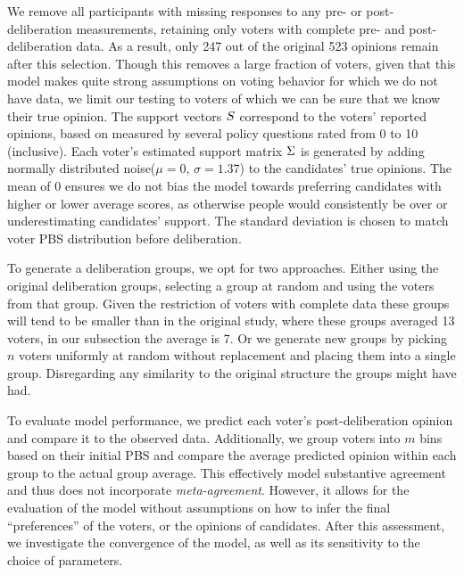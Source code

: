 We remove all participants with missing responses to any pre- or
post-deliberation measurements, retaining only voters with complete pre- and
post-deliberation data. As a result, only 247 out of the original 523 opinions
remain after this selection. Though this removes a large fraction of voters,
given that this model makes quite strong assumptions on voting behavior for
which we do not have data, we limit our testing to voters of which we can be
sure that we know their true opinion. The support vectors $S$ correspond
to the voters' reported opinions, based on measured by several policy questions
rated from 0 to 10 (inclusive). Each voter's estimated support matrix
$\Sigma$ is generated by adding normally distributed noise($\mu=0$, $\sigma=1.37$) to the
candidates' true opinions. The mean of 0 ensures we do not bias the model towards
preferring candidates with higher or lower average scores, as otherwise people
would consistently be over or underestimating candidates' support. The standard
deviation is chosen to match voter PBS distribution before
deliberation.


To generate a deliberation groups, we opt for two approaches. Either using the
original deliberation groups, selecting a group at random and using the voters
from that group. Given the restriction of voters with complete data these
groups will tend to be smaller than in the original study, where these groups
averaged 13 voters, in our subsection the average is 7. Or we generate new
groups by picking $n$ voters uniformly at random without replacement and
placing them into a single group. Disregarding any similarity to the original
structure the groups might have had.

To evaluate model performance, we predict each voter's post-deliberation
opinion and compare it to the observed data. Additionally, we group voters into
$m$ bins based on their initial PBS and compare the average predicted opinion
within each group to the actual group average. This effectively model
substantive agreement and thus does not incorporate \textit{meta-agreement}.
However, it allows for the evaluation of the model without assumptions on how
to infer the final ``preferences'' of the voters, or the opinions of
candidates. After this assessment, we investigate the convergence of the model,
as well as its sensitivity to the choice of parameters. 

